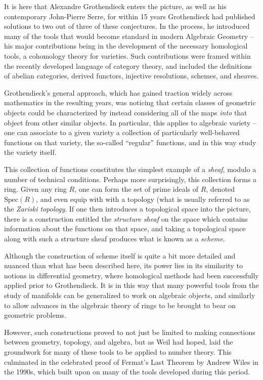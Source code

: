\documentclass{article}
\theoremstyle{definition}
\begin{document}
It is here that Alexandre Grothendieck enters the picture, as well as
his contemporary John-Pierre Serre, for within 15 years Grothendieck had
published solutions to two out of three of these conjectures. In the process, he introduced many of the tools that would become standard in modern Algebraic Geometry -- his major contributions being in the development of the necessary homological tools, a cohomology theory for varieties. Such contributions were framed within the recently developed language of category theory, and included the definitions of abelian categories, derived functors, injective resolutions, schemes, and sheaves.

Grothendieck's general approach, which has gained traction widely across
mathematics in the resulting years, was noticing that certain classes of
geometric objects could be characterized by instead considering all of
the maps \emph{into} that object from other similar objects. In
particular, this applies to algebraic variety -- one can associate to a
given variety a collection of particularly well-behaved functions on
that variety, the so-called ``regular'' functions, and in this way study
the variety itself.

This collection of functions constitutes the simplest example of a
\emph{sheaf}, modulo a number of technical conditions. Perhaps more surprisingly, this collection forms a ring.
Given any ring \(R\), one can form the set of prime ideals of \(R\),
denoted \(\text{Spec}(R)\), and even equip with with a topology (what is
usually referred to as the \emph{Zariski topology}. If one then
introduces a topological space into the picture, there is a construction
entitled the \emph{structure sheaf} on the space which contains
information about the functions on that space, and taking a topological
space along with such a structure sheaf produces what is known
as a \emph{scheme}.

Although the construction of scheme itself is quite a bit more detailed and nuanced than what has been described here, its power lies
in its similarity to notions in differential geometry, where homological
methods had been successfully applied prior to Grothendieck. It is in this way that many
powerful tools from the study of manifolds can be generalized to work on
algebraic objects, and similarly to allow advances in the algebraic
theory of rings to be brought to bear on geometric problems.

However, such constructions proved to not just be limited to making connections
between geometry, topology, and algebra, but as Weil had hoped, laid the
groundwork for many of these tools to be applied to number theory. This
culminated in the celebrated proof of Fermat's Last Theorem by Andrew
Wiles in the 1990s, which built upon on many of the tools developed
during this period.
\end{document}
